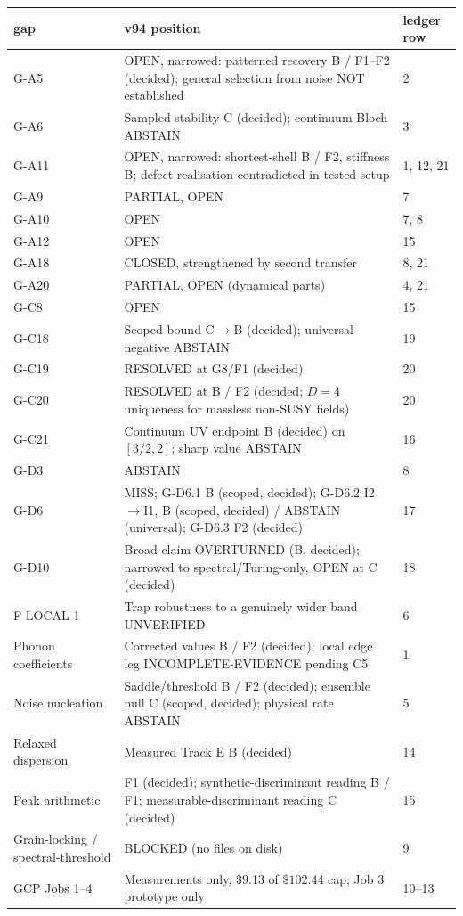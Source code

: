 \documentclass[a4paper,11pt]{article}
\begin{document}
\begin{center}
\begin{xltabular}{\linewidth}{l>{\raggedright\arraybackslash}Xl}
\hline
gap & v94 position & ledger row \\
\hline
G-A5 & OPEN, narrowed: patterned recovery B / F1--F2 (decided); general selection from noise NOT established & 2 \\
G-A6 & Sampled stability C (decided); continuum Bloch ABSTAIN & 3 \\
G-A11 & OPEN, narrowed: shortest-shell B / F2, stiffness B; defect realisation contradicted in tested setup & 1, 12, 21 \\
G-A9 & PARTIAL, OPEN & 7 \\
G-A10 & OPEN & 7, 8 \\
G-A12 & OPEN & 15 \\
G-A18 & CLOSED, strengthened by second transfer & 8, 21 \\
G-A20 & PARTIAL, OPEN (dynamical parts) & 4, 21 \\
G-C8 & OPEN & 15 \\
G-C18 & Scoped bound C$\to$B (decided); universal negative ABSTAIN & 19 \\
G-C19 & RESOLVED at G8/F1 (decided) & 20 \\
G-C20 & RESOLVED at B / F2 (decided; $D=4$ uniqueness for massless non-SUSY fields) & 20 \\
G-C21 & Continuum UV endpoint B (decided) on $[3/2,2]$; sharp value ABSTAIN & 16 \\
G-D3 & ABSTAIN & 8 \\
G-D6 & MISS; G-D6.1 B (scoped, decided); G-D6.2 I2$\to$I1, B (scoped, decided) / ABSTAIN (universal); G-D6.3 F2 (decided) & 17 \\
G-D10 & Broad claim OVERTURNED (B, decided); narrowed to spectral/Turing-only, OPEN at C (decided) & 18 \\
F-LOCAL-1 & Trap robustness to a genuinely wider band UNVERIFIED & 6 \\
Phonon coefficients & Corrected values B / F2 (decided); local edge leg INCOMPLETE-EVIDENCE pending C5 & 1 \\
Noise nucleation & Saddle/threshold B / F2 (decided); ensemble null C (scoped, decided); physical rate ABSTAIN & 5 \\
Relaxed dispersion & Measured Track E B (decided) & 14 \\
Peak arithmetic & F1 (decided); synthetic-discriminant reading B / F1; measurable-discriminant reading C (decided) & 15 \\
Grain-locking / spectral-threshold & BLOCKED (no files on disk) & 9 \\
GCP Jobs 1--4 & Measurements only, $\$9.13$ of $\$102.44$ cap; Job 3 prototype only & 10--13 \\
\hline
\end{xltabular}
\end{center}
\end{document}
